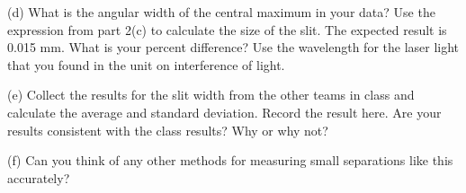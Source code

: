 (d) What is the angular width of the central maximum in your data?
Use the expression from part 2(c) to calculate the size of the slit.
The expected result is 0.015 mm. What is your percent difference?
Use the wavelength for the laser light that you found in the unit
on interference of light.
\vspace{30mm}

(e) Collect the results for the slit width from the other teams in class
and calculate the average and standard deviation. Record the result here.
Are your results consistent with the class results? Why or why not?
\vspace{60mm}

(f) Can you think of any other methods for measuring small separations
like this accurately?

